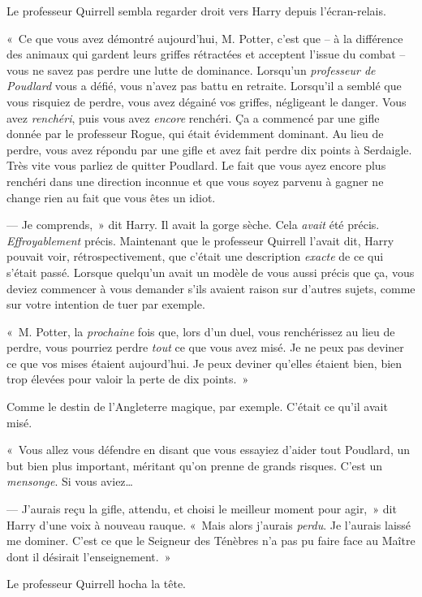 Le professeur Quirrell sembla regarder droit vers Harry depuis l'écran-relais.

«~Ce que vous avez démontré aujourd'hui, M. Potter, c'est que -- à la différence des animaux qui gardent leurs griffes rétractées et acceptent l'issue du combat -- vous ne savez pas perdre une lutte de dominance.
Lorsqu'un \emph{professeur de Poudlard} vous a défié, vous n'avez pas battu en retraite.
Lorsqu'il a semblé que vous risquiez de perdre, vous avez dégainé vos griffes, négligeant le danger.
Vous avez \emph{renchéri}, puis vous avez \emph{encore} renchéri.
Ça a commencé par une gifle donnée par le professeur Rogue, qui était évidemment dominant.
Au lieu de perdre, vous avez répondu par une gifle et avez fait perdre dix points à Serdaigle.
Très vite vous parliez de quitter Poudlard.
Le fait que vous ayez encore plus renchéri dans une direction inconnue et que vous soyez parvenu à gagner ne change rien au fait que vous êtes un idiot.

--- Je comprends,~» dit Harry.
Il avait la gorge sèche.
Cela \emph{avait} été précis.
\emph{Effroyablement} précis.
Maintenant que le professeur Quirrell l'avait dit, Harry pouvait voir, rétrospectivement, que c'était une description \emph{exacte} de ce qui s'était passé.
Lorsque quelqu'un avait un modèle de vous aussi précis que ça, vous deviez commencer à vous demander s'ils avaient raison sur d'autres sujets, comme sur votre intention de tuer par exemple.

«~M. Potter, la \emph{prochaine} fois que, lors d'un duel, vous renchérissez au lieu de perdre, vous pourriez perdre \emph{tout} ce que vous avez misé.
Je ne peux pas deviner ce que vos mises étaient aujourd'hui.
Je peux deviner qu'elles étaient bien, bien trop élevées pour valoir la perte de dix points.~»

Comme le destin de l'Angleterre magique, par exemple.
C'était ce qu'il avait misé.

«~Vous allez vous défendre en disant que vous essayiez d'aider tout Poudlard, un but bien plus important, méritant qu'on prenne de grands risques.
C'est un \emph{mensonge}.
Si vous aviez…

--- J'aurais reçu la gifle, attendu, et choisi le meilleur moment pour agir,~» dit Harry d'une voix à nouveau rauque.
«~Mais alors j'aurais \emph{perdu}.
Je l'aurais laissé me dominer.
C'est ce que le Seigneur des Ténèbres n'a pas pu faire face au Maître dont il désirait l'enseignement.~»

Le professeur Quirrell hocha la tête.

